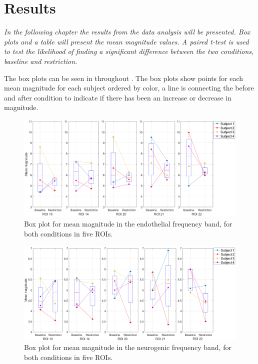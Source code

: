 \chapter{Results}
\textit{In the following chapter the results from the data analysis will be presented. Box plots and a table will present the mean magnitude values. A paired t-test is used to test the likelihood of finding a significant difference between the two conditions, baseline and restriction.}

The box plots can be seen in  throughout . The box plots show points for each mean magnitude for each subject ordered by color, a line is connecting the before and after condition to indicate if there has been an increase or decrease in magnitude. 

\begin{figure}[H]
	\includegraphics[width=1\textwidth]{figures/boxplot_endo}
	\caption{Box plot for mean magnitude in the endothelial frequency band, for both conditions in five ROIs.}
	\label{fig:boxEndo}
\end{figure}

\begin{figure}[H]
	\includegraphics[width=1\textwidth]{figures/boxplot_neuro}
	\caption{Box plot for mean magnitude in the neurogenic frequency band, for both conditions in five ROIs.}
	\label{fig:boxNeuro}
\end{figure}

